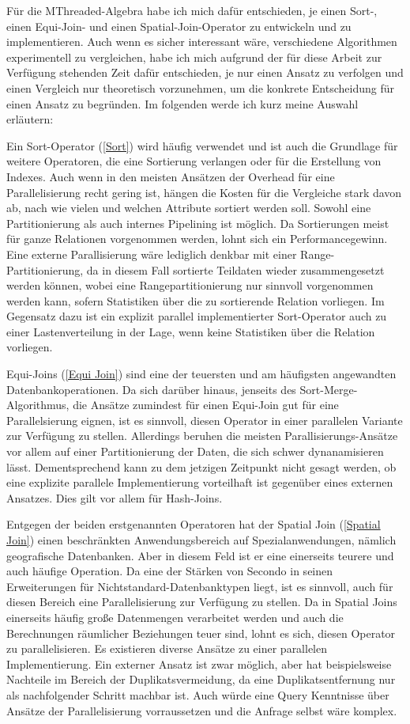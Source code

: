 \documentclass[a4paper,12pt,twoside]{article}
\begin{document}
Für die MThreaded-Algebra habe ich mich dafür entschieden, je einen Sort-, einen Equi-Join- und einen Spatial-Join-Operator zu entwickeln und zu implementieren. Auch wenn es sicher interessant wäre, verschiedene Algorithmen experimentell zu vergleichen, habe ich mich aufgrund der für diese Arbeit zur Verfügung stehenden Zeit dafür entschieden, je nur einen Ansatz zu verfolgen und einen Vergleich nur theoretisch vorzunehmen, um die konkrete Entscheidung für einen Ansatz zu begründen. Im folgenden werde ich kurz meine Auswahl erläutern:

Ein Sort-Operator (\autoref{Sort}) wird häufig verwendet und ist auch die Grundlage für weitere Operatoren, die eine Sortierung verlangen oder für die Erstellung von Indexes. Auch wenn in den meisten Ansätzen der Overhead für eine Parallelisierung recht gering ist, hängen die Kosten für die Vergleiche stark davon ab, nach wie vielen und welchen Attribute sortiert werden soll. Sowohl eine Partitionierung als auch internes Pipelining ist möglich. Da Sortierungen meist für ganze Relationen vorgenommen werden, lohnt sich ein Performancegewinn. Eine externe Parallisierung wäre lediglich denkbar mit einer Range-Partitionierung, da in diesem Fall sortierte Teildaten wieder zusammengesetzt werden können, wobei eine Rangepartitionierung nur sinnvoll vorgenommen werden kann, sofern Statistiken über die zu sortierende Relation vorliegen. Im Gegensatz dazu ist ein explizit parallel implementierter Sort-Operator auch zu einer Lastenverteilung in der Lage, wenn keine Statistiken über die Relation vorliegen.

Equi-Joins (\autoref{Equi Join}) sind eine der teuersten und am häufigsten angewandten Datenbankoperationen. Da sich darüber hinaus, jenseits des Sort-Merge-Algorithmus, die Ansätze zumindest für einen Equi-Join gut für eine Parallelsierung eignen, ist es sinnvoll, diesen Operator in einer parallelen Variante zur Verfügung zu stellen. Allerdings beruhen die meisten Parallisierungs-Ansätze vor allem auf einer Partitionierung der Daten, die sich schwer dynanamisieren lässt. Dementsprechend kann zu dem jetzigen Zeitpunkt nicht gesagt werden, ob eine explizite parallele Implementierung vorteilhaft ist gegenüber eines externen Ansatzes. Dies gilt vor allem für Hash-Joins.

Entgegen der beiden erstgenannten Operatoren hat der Spatial Join (\autoref{Spatial Join}) einen beschränkten Anwendungsbereich auf Spezialanwendungen, nämlich geografische Datenbanken. Aber in diesem Feld ist er eine einerseits teurere und auch häufige Operation. Da eine der Stärken von Secondo in seinen Erweiterungen für Nichtstandard-Datenbanktypen liegt, ist es sinnvoll, auch für diesen Bereich eine Parallelisierung zur Verfügung zu stellen. Da in Spatial Joins einerseits häufig große Datenmengen verarbeitet werden und auch die Berechnungen räumlicher Beziehungen teuer sind, lohnt es sich, diesen Operator zu parallelisieren. Es existieren diverse Ansätze zu einer parallelen Implementierung. Ein externer Ansatz ist zwar möglich, aber hat beispielsweise Nachteile im Bereich der Duplikatsvermeidung, da eine Duplikatsentfernung nur als nachfolgender Schritt machbar ist. Auch würde eine Query Kenntnisse über Ansätze der Parallelisierung vorraussetzen und die Anfrage selbst wäre komplex. 
\end{document}
